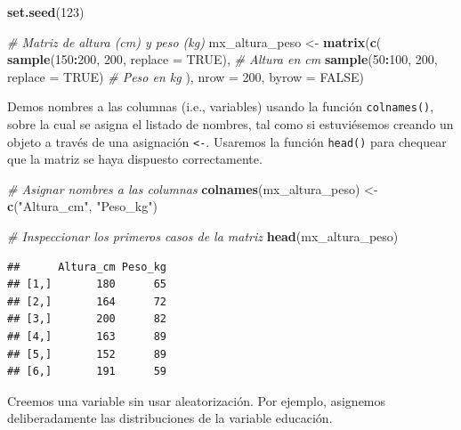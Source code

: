 \documentclass[
]{book}
\newenvironment{Shaded}{\begin{snugshade}}{\end{snugshade}}
\newcommand{\AttributeTok}[1]{\textcolor[rgb]{0.13,0.29,0.53}{#1}}
\newcommand{\CommentTok}[1]{\textcolor[rgb]{0.56,0.35,0.01}{\textit{#1}}}
\newcommand{\ConstantTok}[1]{\textcolor[rgb]{0.56,0.35,0.01}{#1}}
\newcommand{\DecValTok}[1]{\textcolor[rgb]{0.00,0.00,0.81}{#1}}
\newcommand{\FunctionTok}[1]{\textcolor[rgb]{0.13,0.29,0.53}{\textbf{#1}}}
\newcommand{\NormalTok}[1]{#1}
\newcommand{\OtherTok}[1]{\textcolor[rgb]{0.56,0.35,0.01}{#1}}
\newcommand{\SpecialCharTok}[1]{\textcolor[rgb]{0.81,0.36,0.00}{\textbf{#1}}}
\newcommand{\StringTok}[1]{\textcolor[rgb]{0.31,0.60,0.02}{#1}}
\begin{document}
\begin{Shaded}
\begin{Highlighting}[]
\FunctionTok{set.seed}\NormalTok{(}\DecValTok{123}\NormalTok{)}

\CommentTok{\# Matriz de altura (cm) y peso (kg)}
\NormalTok{mx\_altura\_peso }\OtherTok{\textless{}{-}} \FunctionTok{matrix}\NormalTok{(}\FunctionTok{c}\NormalTok{(}
  \FunctionTok{sample}\NormalTok{(}\DecValTok{150}\SpecialCharTok{:}\DecValTok{200}\NormalTok{, }\DecValTok{200}\NormalTok{, }\AttributeTok{replace =} \ConstantTok{TRUE}\NormalTok{),  }\CommentTok{\# Altura en cm}
  \FunctionTok{sample}\NormalTok{(}\DecValTok{50}\SpecialCharTok{:}\DecValTok{100}\NormalTok{, }\DecValTok{200}\NormalTok{, }\AttributeTok{replace =} \ConstantTok{TRUE}\NormalTok{)   }\CommentTok{\# Peso en kg}
\NormalTok{), }\AttributeTok{nrow =} \DecValTok{200}\NormalTok{, }\AttributeTok{byrow =} \ConstantTok{FALSE}\NormalTok{)}
\end{Highlighting}
\end{Shaded}

Demos nombres a las columnas (i.e., variables) usando la función \texttt{colnames()}, sobre la cual se asigna el listado de nombres, tal como si estuviésemos creando un objeto a través de una asignación \texttt{\textless{}-}. Usaremos la función \texttt{head()} para chequear que la matriz se haya dispuesto correctamente.

\begin{Shaded}
\begin{Highlighting}[]
\CommentTok{\# Asignar nombres a las columnas}
\FunctionTok{colnames}\NormalTok{(mx\_altura\_peso) }\OtherTok{\textless{}{-}} \FunctionTok{c}\NormalTok{(}\StringTok{"Altura\_cm"}\NormalTok{, }\StringTok{"Peso\_kg"}\NormalTok{)}

\CommentTok{\# Inspeccionar los primeros casos de la matriz}
\FunctionTok{head}\NormalTok{(mx\_altura\_peso)}
\end{Highlighting}
\end{Shaded}

\begin{verbatim}
##      Altura_cm Peso_kg
## [1,]       180      65
## [2,]       164      72
## [3,]       200      82
## [4,]       163      89
## [5,]       152      89
## [6,]       191      59
\end{verbatim}

Creemos una variable sin usar aleatorización. Por ejemplo, asignemos deliberadamente las distribuciones de la variable educación.
\end{document}
